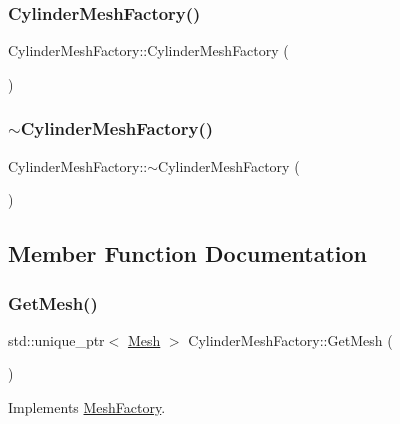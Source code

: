 \subsubsection{\texorpdfstring{CylinderMeshFactory()}{CylinderMeshFactory()}}
{\footnotesize\ttfamily Cylinder\+Mesh\+Factory\+::\+Cylinder\+Mesh\+Factory (\begin{DoxyParamCaption}{ }\end{DoxyParamCaption})}

\mbox{\label{class_cylinder_mesh_factory_ad7182f0fb1217b9d9ab5270f10ebb007}} 
\subsubsection{\texorpdfstring{$\sim$CylinderMeshFactory()}{~CylinderMeshFactory()}}
{\footnotesize\ttfamily Cylinder\+Mesh\+Factory\+::$\sim$\+Cylinder\+Mesh\+Factory (\begin{DoxyParamCaption}{ }\end{DoxyParamCaption})}



\subsection{Member Function Documentation}
\mbox{\label{class_cylinder_mesh_factory_a6693199a1ec7dc082b56be29213b97d2}} 
\subsubsection{\texorpdfstring{GetMesh()}{GetMesh()}}
{\footnotesize\ttfamily std\+::unique\+\_\+ptr$<$ \mbox{\hyperlink{class_mesh}{Mesh}} $>$ Cylinder\+Mesh\+Factory\+::\+Get\+Mesh (\begin{DoxyParamCaption}{ }\end{DoxyParamCaption})\hspace{0.3cm}{\ttfamily [virtual]}}



Implements \mbox{\hyperlink{class_mesh_factory_a4cc58b609d0f4f5209cf5245e16f0720}{Mesh\+Factory}}.

